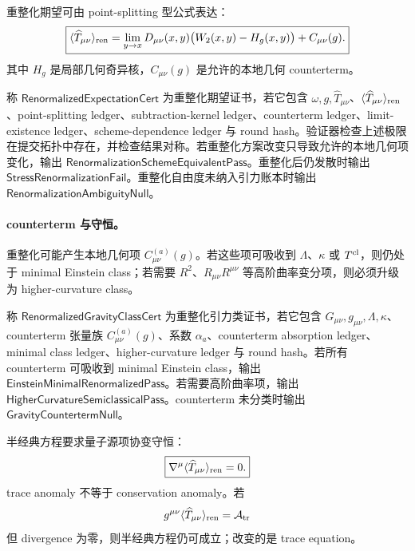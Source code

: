 重整化期望可由 point-splitting 型公式表达：
\[
\boxed{
\langle\widehat T_{\mu\nu}\rangle_{\rm ren}
=
\lim_{y\to x}
D_{\mu\nu}(x,y)\bigl(W_2(x,y)-H_g(x,y)\bigr)
+
C_{\mu\nu}(g).
}
\]
其中 \(H_g\) 是局部几何奇异核，\(C_{\mu\nu}(g)\) 是允许的本地几何 counterterm。

\begin{definition}[重整化期望证书]\label{def:typed-address-biaxial-completion-renormalized-expectation-cert}
称 \(\mathsf{RenormalizedExpectationCert}\) 为重整化期望证书，若它包含 \(\omega,g,\widehat T_{\mu\nu}\)、\(\langle\widehat T_{\mu\nu}\rangle_{\rm ren}\)、point-splitting ledger、subtraction-kernel ledger、counterterm ledger、limit-existence ledger、scheme-dependence ledger 与 round hash。验证器检查上述极限在提交拓扑中存在，并检查结果对称。若重整化方案改变只导致允许的本地几何项变化，输出 \(\mathsf{RenormalizationSchemeEquivalentPass}\)。重整化后仍发散时输出 \(\mathsf{StressRenormalizationFail}\)。重整化自由度未纳入引力账本时输出 \(\mathsf{RenormalizationAmbiguityNull}\)。
\end{definition}

\paragraph{counterterm 与守恒。}
重整化可能产生本地几何项 \(C^{(a)}_{\mu\nu}(g)\)。若这些项可吸收到 \(\Lambda\)、\(\kappa\) 或 \(T^{\rm cl}\)，则仍处于 minimal Einstein class；若需要 \(R^2\)、\(R_{\mu\nu}R^{\mu\nu}\) 等高阶曲率变分项，则必须升级为 higher-curvature class。

\begin{definition}[重整化引力类证书]\label{def:typed-address-biaxial-completion-renormalized-gravity-class-cert}
称 \(\mathsf{RenormalizedGravityClassCert}\) 为重整化引力类证书，若它包含 \(G_{\mu\nu},g_{\mu\nu},\Lambda,\kappa\)、counterterm 张量族 \(C^{(a)}_{\mu\nu}(g)\)、系数 \(\alpha_a\)、counterterm absorption ledger、minimal class ledger、higher-curvature ledger 与 round hash。若所有 counterterm 可吸收到 minimal Einstein class，输出 \(\mathsf{EinsteinMinimalRenormalizedPass}\)。若需要高阶曲率项，输出 \(\mathsf{HigherCurvatureSemiclassicalPass}\)。counterterm 未分类时输出 \(\mathsf{GravityCountertermNull}\)。
\end{definition}

半经典方程要求量子源项协变守恒：
\[
\boxed{
\nabla^\mu\langle\widehat T_{\mu\nu}\rangle_{\rm ren}=0.
}
\]
trace anomaly 不等于 conservation anomaly。若
\[
g^{\mu\nu}\langle\widehat T_{\mu\nu}\rangle_{\rm ren}
=
\mathcal A_{\rm tr}
\]
但 divergence 为零，则半经典方程仍可成立；改变的是 trace equation。

